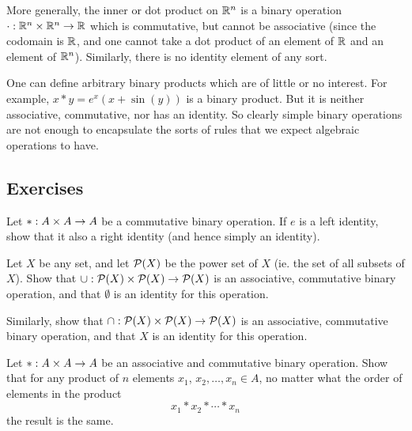\begin{example}
More generally, the inner or dot product on $\mathbb{R}^{n}$ is a binary
operation $\cdot: \mathbb{R}^{n} \times \mathbb{R}^{n} \to \mathbb{R}$ which is
commutative, but cannot be associative (since the codomain is $\mathbb{R}$, and
one cannot take a dot product of an element of $\mathbb{R}$ and an element of
$\mathbb{R}^{n}$).  Similarly, there is no identity element of any sort.
\end{example}

\begin{example}
One can define arbitrary binary products which are of little or no interest.
For example, $x \ast y = e^{x}(x + \sin(y))$ is a binary product.  But it is
neither associative, commutative, nor has an identity.  So clearly simple
binary operations are not enough to encapsulate the sorts of rules that we
expect algebraic operations to have.
\end{example}

\subsection*{Exercises}

\begin{exercises}
  \item Let $\ast: A \times A \to A$ be a commutative binary operation.  If
$e$ is a left identity, show that it also a right identity (and hence simply
an identity).

  \item Let $X$ be any set, and let $\mathcal{P}(X)$ be the power set of
$X$ (ie. the set of all subsets of $X$).  Show that $\cup : \mathcal{P}(X)
\times \mathcal{P}(X) \to \mathcal{P}(X)$ is an associative, commutative binary
operation, and that $\emptyset$ is an identity for this operation.

  Similarly, show that $\cap : \mathcal{P}(X) \times \mathcal{P}(X) \to
\mathcal{P}(X)$ is an associative, commutative binary operation, and that
$X$ is an identity for this operation.

  \item Let $\ast: A \times A \to A$ be an associative and commutative binary
    operation.  Show that for any product of $n$ elements $x_{1}$, $x_{2},
    \ldots, x_{n} \in A$, no matter what the order of elements in the product
    \[
      x_{1} \ast x_{2} \ast \cdots \ast x_{n}
    \]
    the result is the same.

\end{exercises}

